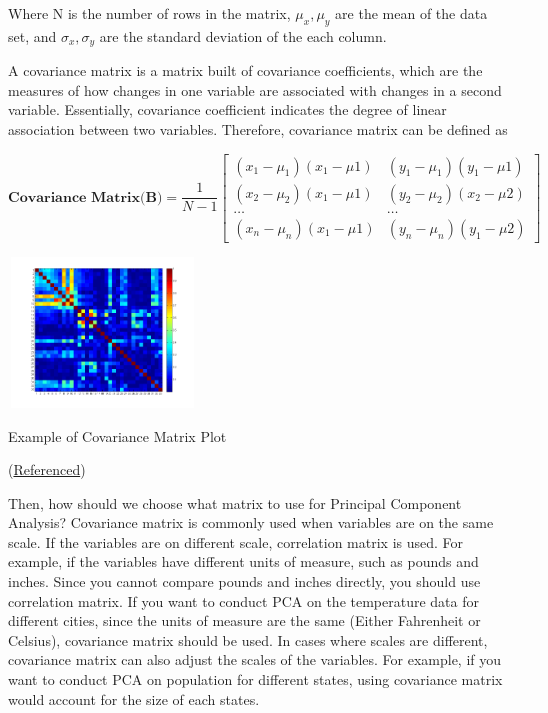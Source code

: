 \documentclass{tufte-handout}
\begin{document}
Where N is the number of rows in the matrix, $\mu_{x}, \mu_{y}$ are the mean of the data set, and $\sigma_{x}, \sigma_{y}$ are the standard deviation of the each column. 

A covariance matrix is a matrix built of covariance coefficients, which are the measures of how changes in one variable are associated with changes in a second variable. Essentially, covariance coefficient indicates the degree of linear association between two variables. Therefore, covariance matrix can be defined as

\[
\textbf{Covariance Matrix(B)}= 
\frac{1}{N-1}
\begin{bmatrix}
    (x_{1}-\mu_{1})(x_{1}-\mu{1})  & (y_{1}-\mu_{1})(y_{1}-\mu{1}) \\
    (x_{2}-\mu_{2})(x_{1}-\mu{1}) & (y_{2}-\mu_{2})(x_{2}-\mu{2}) \\
        \dots  & \dots \\
    (x_{n}-\mu_{n})(x_{1}-\mu{1}) & (y_{n}-\mu_{n})(y_{1}-\mu{2}) 

\end{bmatrix}
\]

\begin{marginfigure}
    \centering
    \includegraphics[width = 5cm, height = 4cm]{cov.png}
    \label{fig:cov}
\caption{Example of Covariance Matrix Plot}
(\href{https://www.mathworks.com/matlabcentral/answers/196574-factor-analysis-a-covariance-matrix-is-not-positive-definite}{Referenced})

\end{marginfigure}

Then, how should we choose what matrix to use for Principal Component Analysis? Covariance matrix is commonly used when variables are on the same scale. If the variables are on different scale, correlation matrix is used. For example, if the variables have different units of measure, such as pounds and inches. Since you cannot compare pounds and inches directly, you should use correlation matrix. If you want to conduct PCA on the temperature data for different cities, since the units of measure are the same (Either Fahrenheit or Celsius), covariance matrix should be used. In cases where scales are different, covariance matrix can also adjust the scales of the variables. For example, if you want to conduct PCA on population for different states, using covariance matrix would account for the size of each states.
\end{document}
